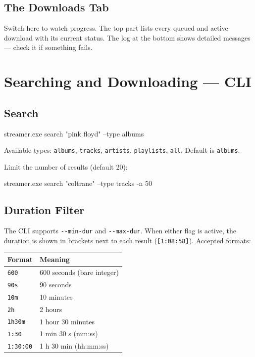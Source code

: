 \documentclass[11pt,a4paper]{article}
\begin{document}
\subsection{The Downloads Tab}

Switch here to watch progress.  The top part lists every queued and active
download with its current status.  The log at the bottom shows detailed
messages --- check it if something fails.

\section{Searching and Downloading --- CLI}

\subsection{Search}

\begin{cmdbox}
streamer.exe search "pink floyd" --type albums
\end{cmdbox}

Available types: \texttt{albums}, \texttt{tracks}, \texttt{artists},
\texttt{playlists}, \texttt{all}.  Default is \texttt{albums}.

\medskip
Limit the number of results (default 20):

\begin{cmdbox}
streamer.exe search "coltrane" --type tracks -n 50
\end{cmdbox}

\subsection{Duration Filter}

The CLI supports \texttt{-{}-min-dur} and \texttt{-{}-max-dur}.
When either flag is active, the duration is shown in brackets next to each
result (\texttt{[1:08:58]}).  Accepted formats:

\begin{center}
\begin{tabular}{@{}ll@{}}
\toprule
\textbf{Format}  & \textbf{Meaning} \\
\midrule
\texttt{600}     & 600 seconds (bare integer) \\
\texttt{90s}     & 90 seconds \\
\texttt{10m}     & 10 minutes \\
\texttt{2h}      & 2 hours \\
\texttt{1h30m}   & 1 hour 30 minutes \\
\texttt{1:30}    & 1 min 30 s (mm:ss) \\
\texttt{1:30:00} & 1 h 30 min (hh:mm:ss) \\
\bottomrule
\end{tabular}
\end{center}
\end{document}

